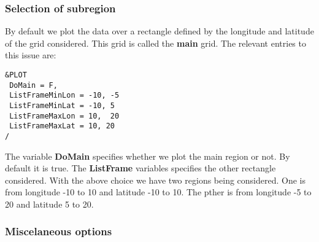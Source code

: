 \documentclass[12pt]{amsart}
\begin{document}
\subsubsection{Selection of subregion}
By default we plot the data over a rectangle defined by the longitude and latitude of the grid considered. This grid is called the {\bf main} grid.
The relevant entries to this issue are:
\begin{verbatim}
&PLOT
 DoMain = F,
 ListFrameMinLon = -10, -5
 ListFrameMinLat = -10, 5
 ListFrameMaxLon = 10,  20
 ListFrameMaxLat = 10, 20
/
\end{verbatim}
The variable {\bf DoMain} specifies whether we plot the main region or not. By default it is true.
The {\bf ListFrame} variables specifies the other rectangle considered. With the above choice we have two regions being considered. One is from longitude -10 to 10 and latitude -10 to 10. The pther is from longitude -5 to 20 and latitude 5 to 20.



\subsubsection{Miscelaneous options}
\end{document}
